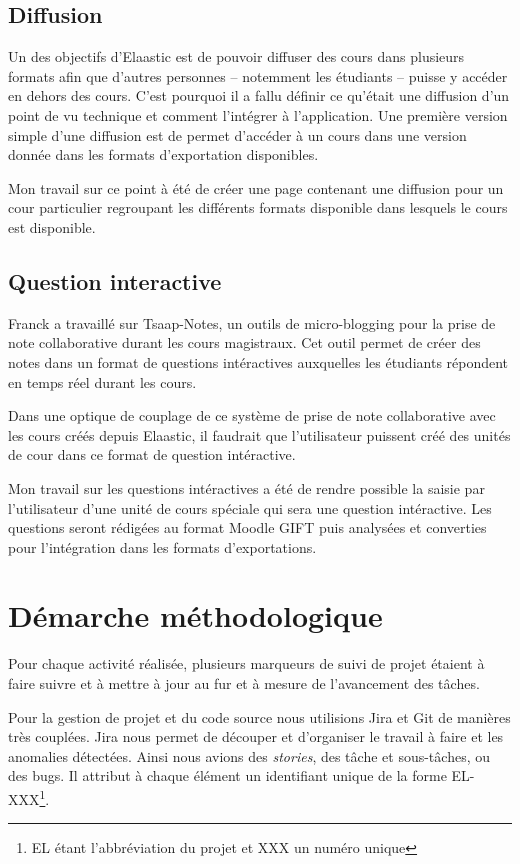 \subsection{Diffusion}
Un des objectifs d'Elaastic est de pouvoir diffuser des cours dans plusieurs
formats afin que d'autres personnes -- notemment les étudiants -- puisse y
accéder en dehors des cours. C'est pourquoi il a fallu définir ce qu'était une
diffusion d'un point de vu technique et comment l'intégrer à l'application. Une
première version simple d'une diffusion est de permet d'accéder à un cours dans
une version donnée dans les formats d'exportation disponibles.

Mon travail sur ce point à été de créer une page contenant une diffusion pour un
cour particulier regroupant les différents formats disponible dans lesquels le
cours est disponible.

\subsection{Question interactive}
Franck a travaillé sur Tsaap-Notes, un outils de micro-blogging pour la prise de
note collaborative durant les cours magistraux. Cet outil permet de créer des
notes dans un format de questions intéractives auxquelles les étudiants
répondent en temps réel durant les cours.

Dans une optique de couplage de ce système de prise de note collaborative avec
les cours créés depuis Elaastic, il faudrait que l'utilisateur puissent créé des
unités de cour dans ce format de question intéractive.

Mon travail sur les questions intéractives a été de rendre possible la saisie par
l'utilisateur d'une unité de cours spéciale qui sera une question intéractive.
Les questions seront rédigées au format Moodle GIFT puis analysées et converties
pour l'intégration dans les formats d'exportations.

\section{Démarche méthodologique}
Pour chaque activité réalisée, plusieurs marqueurs de suivi de projet étaient à
faire suivre et à mettre à jour au fur et à mesure de l'avancement des tâches.

Pour la gestion de projet et du code source nous utilisions Jira et Git de
manières très couplées. Jira nous permet de découper et d'organiser le travail à
faire et les anomalies détectées. Ainsi nous avions des {\em stories}, des tâche
et sous-tâches, ou des bugs. Il attribut à chaque élément un identifiant unique
de la forme EL-XXX\footnote{EL étant l'abbréviation du projet et XXX un numéro
unique}.

